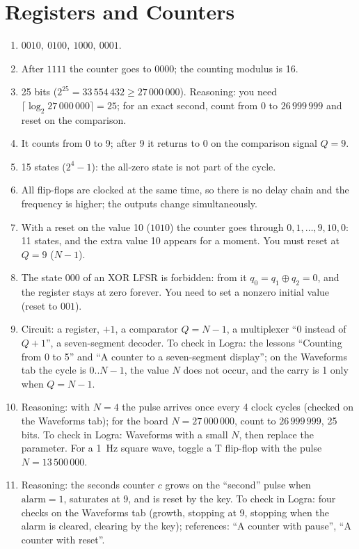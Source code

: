 \section*{Registers and Counters}
\begin{enumerate}
  \item {} $0010,\ 0100,\ 1000,\ 0001$.
  \item {} After $1111$ the counter goes to $0000$; the counting modulus is 16.
  \item {} 25 bits ($2^{25}=33\,554\,432\ge 27\,000\,000$). Reasoning: you need $\lceil\log_2 27\,000\,000\rceil=25$; for an exact second, count from 0 to $26\,999\,999$ and reset on the comparison.
  \item {} It counts from 0 to 9; after 9 it returns to 0 on the comparison signal $Q=9$.
  \item {} 15 states ($2^4-1$): the all-zero state is not part of the cycle.
  \item {} All flip-flops are clocked at the same time, so there is no delay chain and the frequency is higher; the outputs change simultaneously.
  \item {} With a reset on the value 10 ($1010$) the counter goes through $0,1,\ldots,9,10,0$: 11 states, and the extra value 10 appears for a moment. You must reset at $Q=9$ ($N-1$).
  \item {} The state $000$ of an XOR LFSR is forbidden: from it $q_0=q_1\oplus q_2=0$, and the register stays at zero forever. You need to set a nonzero initial value (reset to $001$).
  \item {} Circuit: a register, $+1$, a comparator $Q=N-1$, a multiplexer ``0 instead of $Q+1$'', a seven-segment decoder. To check in Logra: the lessons ``Counting from 0 to 5'' and ``A counter to a seven-segment display''; on the Waveforms tab the cycle is $0..N-1$, the value $N$ does not occur, and the carry is 1 only when $Q=N-1$.
  \item {} Reasoning: with $N=4$ the pulse arrives once every 4 clock cycles (checked on the Waveforms tab); for the board $N=27\,000\,000$, count to $26\,999\,999$, 25 bits. To check in Logra: Waveforms with a small $N$, then replace the parameter. For a 1~Hz square wave, toggle a T flip-flop with the pulse $N=13\,500\,000$.
  \item {} Reasoning: the seconds counter $c$ grows on the ``second'' pulse when $\text{alarm}=1$, saturates at 9, and is reset by the key. To check in Logra: four checks on the Waveforms tab (growth, stopping at 9, stopping when the alarm is cleared, clearing by the key); references: ``A counter with pause'', ``A counter with reset''.
\end{enumerate}

